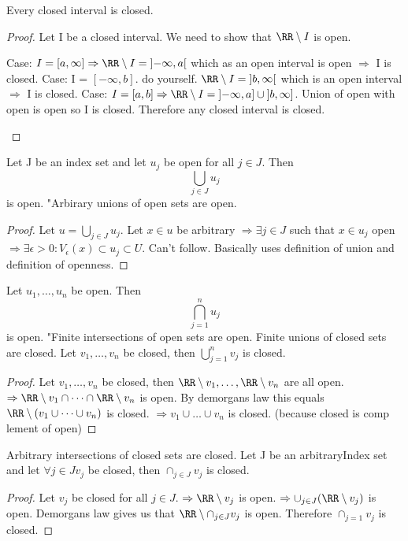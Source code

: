\documentclass[class=scrartcl, crop=false]{standalone}
\begin{document}
\begin{theorem}
  Every closed interval is closed.
  \begin{proof}
    Let I be a closed interval. We need to show that $\RR \setminus I$ is open.
    \begin{enumerate}
      \ii
      Case: $I = [a, \infty] \Rightarrow \RR \setminus I = \left] -\infty, a\right[$ which as an open interval is open $\Rightarrow$ I is closed.
      \ii
      Case: I = $\left[-\infty, b\right]$. do yourself. $\RR \setminus I = \left]b, \infty\right[$ which is an open interval $\Rightarrow$ I is closed.
      \ii
      Case: $I = \left[a, b\right] \Rightarrow \RR \setminus I = \left]-\infty, a\right] \cup \left]b, \infty\right]$. Union of open with open is open so I is closed. Therefore any closed interval is closed.
    \end{enumerate}
  \end{proof}
\end{theorem}

\begin{theorem}
  \begin{enumerate}[label=\alph*.]
    \ii[]
    \ii
    Let J be an index set and let $u_j$ be open for all $j \in J$. Then
    $$\bigcup_{j \in J}u_j$$ is open.
    "Arbirary unions of open sets are open.
    \begin{proof}
      Let $u = \bigcup_{j \in J}u_j$. Let $x \in u$ be arbitrary $\Rightarrow \exists j \in J$ such that $x \in u_j$ open $\Rightarrow \exists \epsilon > 0: V_\epsilon(x) \subset u_j \subset U$. Can't follow. Basically uses definition of union and definition of openness.
    \end{proof}
    \ii
    Let $u_1, \dots, u_n$ be open. Then 
    $$ \bigcap_{j = 1}^n u_j$$ is open. "Finite intersections of open sets are open.
    \ii
    Finite unions of closed sets are closed.
    Let $v_1, \dots, v_n$ be closed, then $\bigcup_{j = 1}^{n}v_j$ is closed.
    \begin{proof}
      Let $v_1, \dots, v_n$ be closed, then $\RR \setminus v_1, \dots, \RR \setminus v_n$ are all open.
      $\Rightarrow \RR \setminus v_1 \cap \dots \cap \RR \setminus v_n$ is open. By demorgans law this equals $\RR \setminus (v_1 \cup \dots \cup v_n)$ is closed.
      $\Rightarrow v_1 \cup \dots \cup v_n$ is closed. (because closed is comp lement of open)
    \end{proof}
    \ii
    Arbitrary intersections of closed sets are closed.
    Let J be an arbitraryIndex set and let $\forall j \in J v_j$ be closed, then $\cap_{j \in J}v_j$ is closed.
    \begin{proof}
      Let $v_j$ be closed for all $j \in J$.
      $\Rightarrow \RR \setminus v_j$ is open.
      $\Rightarrow \cup_{j \in J}(\RR \setminus v_j)$ is open.
      Demorgans law gives us that $\RR \setminus \cap_{j \in J} v_j$ is open.
      Therefore $\cap_{j = 1}v_j$ is closed.
    \end{proof}
  \end{enumerate}
\end{theorem}
\end{document}
